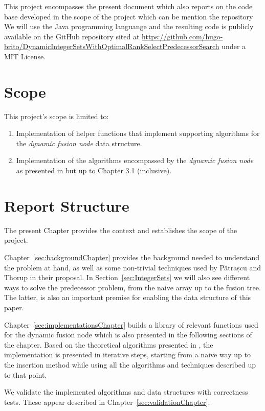 This project encompasses the present document which also reports on the code base developed in the scope of the project which can be 
mention the repository 
We will use the Java programming languange and the resulting code is publicly available on the GitHub repository sited at \url{https://github.com/hugo-brito/DynamicIntegerSetsWithOptimalRankSelectPredecessorSearch} under a MIT License.

\section{Scope}

This project's scope is limited to:
\begin{enumerate}
    \item
    Implementation of helper functions that implement supporting algorithms for the \textit{dynamic fusion node} data structure.
    
    \item
    Implementation of the algorithms encompassed by the \textit{dynamic fusion node} as presented in \cite{patrascu2014dynamic} but up to Chapter 3.1 (inclusive).
\end{enumerate}

\section{Report Structure}

The present Chapter provides the context and establishes the scope of the project.

Chapter~\ref{sec:backgroundChapter} provides the background needed to understand the problem at hand, as well as some non-trivial techniques used by Pătrașcu and Thorup in their proposal.
In Section~\ref{sec:IntegerSets} we will also see different ways to solve the predecessor problem, from the naive array up to the fusion tree. The latter, is also an important premise for enabling the data structure of this paper.

Chapter~\ref{sec:implementationsChapter} builds a library of relevant functions used for the dynamic fusion node which is also presented in the following sections of the chapter.
Based on the theoretical algorithms presented in \cite{patrascu2014dynamic}, the implementation is presented in iterative steps, starting from a naive way up to the insertion method while using all the algorithms and techniques described up to that point.

We validate the implemented algorithms and data structures with correctness tests. These appear described in Chapter~\ref{sec:validationChapter}.

